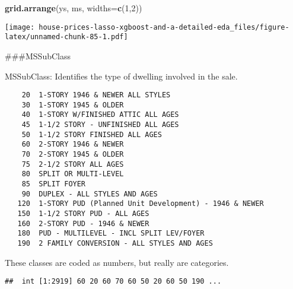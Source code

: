 \documentclass[]{article}
\newenvironment{Shaded}{\begin{snugshade}}{\end{snugshade}}
\newcommand{\DataTypeTok}[1]{\textcolor[rgb]{0.13,0.29,0.53}{#1}}
\newcommand{\DecValTok}[1]{\textcolor[rgb]{0.00,0.00,0.81}{#1}}
\newcommand{\KeywordTok}[1]{\textcolor[rgb]{0.13,0.29,0.53}{\textbf{#1}}}
\newcommand{\NormalTok}[1]{#1}
\newcommand{\OperatorTok}[1]{\textcolor[rgb]{0.81,0.36,0.00}{\textbf{#1}}}
\begin{document}
\begin{Shaded}
\begin{Highlighting}[]
\KeywordTok{grid.arrange}\NormalTok{(ys, ms, }\DataTypeTok{widths=}\KeywordTok{c}\NormalTok{(}\DecValTok{1}\NormalTok{,}\DecValTok{2}\NormalTok{))}
\end{Highlighting}
\end{Shaded}

\texttt{[image: house-prices-lasso-xgboost-and-a-detailed-eda\_files/figure-latex/unnamed-chunk-85-1.pdf]}

\#\#\#MSSubClass

MSSubClass: Identifies the type of dwelling involved in the sale.

\begin{verbatim}
    20  1-STORY 1946 & NEWER ALL STYLES
    30  1-STORY 1945 & OLDER
    40  1-STORY W/FINISHED ATTIC ALL AGES
    45  1-1/2 STORY - UNFINISHED ALL AGES
    50  1-1/2 STORY FINISHED ALL AGES
    60  2-STORY 1946 & NEWER
    70  2-STORY 1945 & OLDER
    75  2-1/2 STORY ALL AGES
    80  SPLIT OR MULTI-LEVEL
    85  SPLIT FOYER
    90  DUPLEX - ALL STYLES AND AGES
   120  1-STORY PUD (Planned Unit Development) - 1946 & NEWER
   150  1-1/2 STORY PUD - ALL AGES
   160  2-STORY PUD - 1946 & NEWER
   180  PUD - MULTILEVEL - INCL SPLIT LEV/FOYER
   190  2 FAMILY CONVERSION - ALL STYLES AND AGES
\end{verbatim}

These classes are coded as numbers, but really are categories.

\begin{Shaded}
\end{Shaded}

\begin{verbatim}
##  int [1:2919] 60 20 60 70 60 50 20 60 50 190 ...
\end{verbatim}
\end{document}
